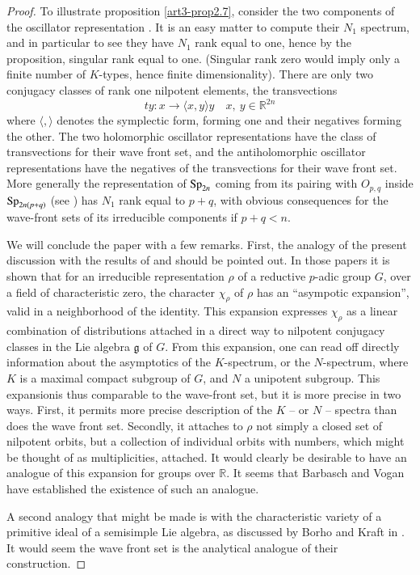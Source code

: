 \begin{proof}
To illustrate proposition \ref{art3-prop2.7}, consider the two components of the oscillator representation \cite{art3-H3}. It is an easy matter to compute their $N_{1}$ spectrum, and in particular to see they have $N_{1}$ rank equal to one, hence by the proposition, singular rank equal to one. (Singular rank zero would imply only a finite number of $K$-types, hence finite dimensionality). There are only two conjugacy classes of rank one nilpotent elements, the transvections
$$
ty:x\to \langle x,y\rangle y\quad x, \ y\in \mathbb{R}^{2n}
$$
where $\langle,\rangle$ denotes the symplectic form, forming one and their negatives forming the other. The two holomorphic oscillator representations have the class of transvections for their wave front set, and the antiholomorphic oscillator representations have the negatives of the transvections for their wave front set. More generally the representation of $\operatorname{Sp}_{2n}$ coming from its pairing with $O_{p,q}$ inside $\operatorname{Sp}_{2n(p+q)}$ (see \cite{art3-H3}) has $N_{1}$ rank equal to $p+q$, with obvious consequences for the wave-front sets of its irreducible components if $p+q<n$.

We will conclude the paper with a few remarks. First, the analogy of the present discussion with the results of \cite{art3-H4} and \cite{art3-HC} should be pointed out. In those papers it is shown that for an irreducible representation $\rho$ of a reductive $p$-adic group $G$, over a field of characteristic zero, the character $\chi_{\rho}$ of $\rho$ has an ``asympotic expansion'', valid in a neighborhood of the identity. This expansion expresses $\chi_{\rho}$ as a linear combination of distributions attached in a direct way to nilpotent conjugacy classes in the Lie algebra $\mathfrak{g}$ of $G$. From this expansion, one can read off directly information about the asymptotics of the $K$-spectrum, or the $N$-spectrum, where $K$ is a maximal compact subgroup of $G$, and $N$ a unipotent subgroup. This expansion\pageoriginale is thus comparable to the wave-front set, but it is more precise in two ways. First, it permits more precise description of the $K$ -- or $N$ -- spectra than does the wave front set. Secondly, it attaches to $\rho$ not simply a closed set of nilpotent orbits, but a collection of individual orbits with numbers, which might be thought of as multiplicities, attached. It would clearly be desirable to have an analogue of this expansion for groups over $\mathbb{R}$. It seems that Barbasch and Vogan \cite{art3-BV} have established the existence of such an analogue.

A second analogy that might be made is with the characteristic variety of a primitive ideal of a semisimple Lie algebra, as discussed by Borho and Kraft in \cite{art3-B-K}. It would seem the wave front set is the analytical analogue of their construction.  
\end{proof}

